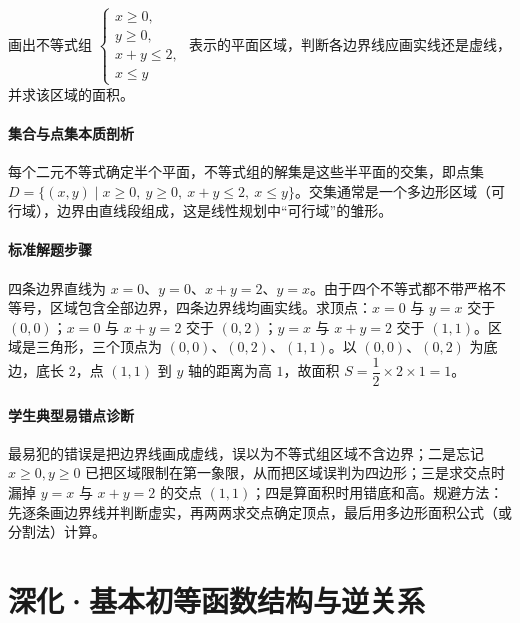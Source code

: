 \begin{problem}
画出不等式组 $\begin{cases}x\geq0,\\ y\geq0,\\ x+y\leq2,\\ x\leq y\end{cases}$ 表示的平面区域，判断各边界线应画实线还是虚线，并求该区域的面积。
\end{problem}
\begin{solution}
\paragraph{集合与点集本质剖析}
每个二元不等式确定半个平面，不等式组的解集是这些半平面的交集，即点集 $D=\{(x,y)\mid x\ge0,\ y\ge0,\ x+y\le2,\ x\le y\}$。交集通常是一个多边形区域（可行域），边界由直线段组成，这是线性规划中“可行域”的雏形。
\paragraph{标准解题步骤}
四条边界直线为 $x=0$、$y=0$、$x+y=2$、$y=x$。由于四个不等式都不带严格不等号，区域包含全部边界，四条边界线均画实线。求顶点：$x=0$ 与 $y=x$ 交于 $(0,0)$；$x=0$ 与 $x+y=2$ 交于 $(0,2)$；$y=x$ 与 $x+y=2$ 交于 $(1,1)$。区域是三角形，三个顶点为 $(0,0)$、$(0,2)$、$(1,1)$。以 $(0,0)$、$(0,2)$ 为底边，底长 $2$，点 $(1,1)$ 到 $y$ 轴的距离为高 $1$，故面积 $S=\dfrac12\times2\times1=1$。
\paragraph{学生典型易错点诊断}
最易犯的错误是把边界线画成虚线，误以为不等式组区域不含边界；二是忘记 $x\geq0,y\geq0$ 已把区域限制在第一象限，从而把区域误判为四边形；三是求交点时漏掉 $y=x$ 与 $x+y=2$ 的交点 $(1,1)$；四是算面积时用错底和高。规避方法：先逐条画边界线并判断虚实，再两两求交点确定顶点，最后用多边形面积公式（或分割法）计算。
\end{solution}

\section{深化·基本初等函数结构与逆关系}

